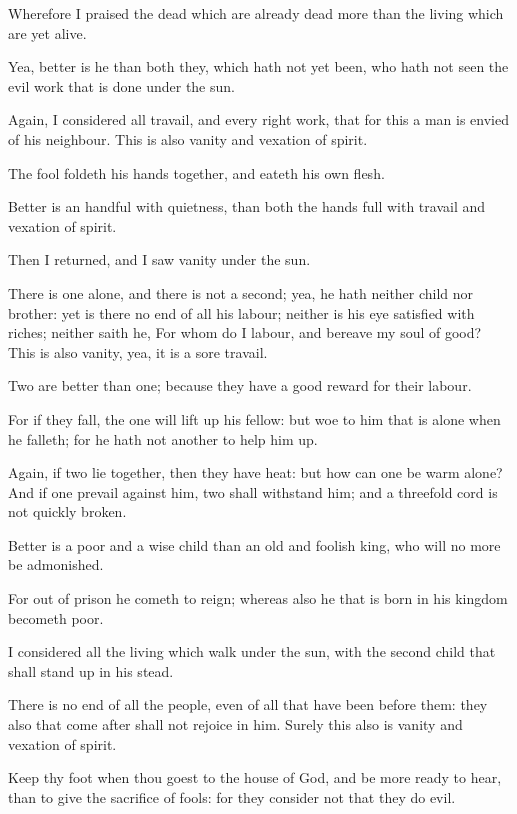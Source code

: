 \Verse Wherefore I praised the dead which are already dead more than the living which are yet alive.

\Verse Yea, better is he than both they, which hath not yet been, who hath not seen the evil work that is done under the sun.

\Verse Again, I considered all travail, and every right work, that for this a man is envied of his neighbour. This is also vanity and vexation of spirit.

\Verse The fool foldeth his hands together, and eateth his own flesh.

\Verse Better is an handful with quietness, than both the hands full with travail and vexation of spirit.

\Verse Then I returned, and I saw vanity under the sun.

\Verse There is one alone, and there is not a second; yea, he hath neither child nor brother: yet is there no end of all his labour; neither is his eye satisfied with riches; neither saith he, For whom do I labour, and bereave my soul of good? This is also vanity, yea, it is a sore travail.

\Verse Two are better than one; because they have a good reward for their labour.

\Verse For if they fall, the one will lift up his fellow: but woe to him that is alone when he falleth; for he hath not another to help him up.

\Verse Again, if two lie together, then they have heat: but how can one be warm alone?  \Verse And if one prevail against him, two shall withstand him; and a threefold cord is not quickly broken.

\Verse Better is a poor and a wise child than an old and foolish king, who will no more be admonished.

\Verse For out of prison he cometh to reign; whereas also he that is born in his kingdom becometh poor.

\Verse I considered all the living which walk under the sun, with the second child that shall stand up in his stead.

\Verse There is no end of all the people, even of all that have been before them: they also that come after shall not rejoice in him.  Surely this also is vanity and vexation of spirit.


\Chapter
\Verse Keep thy foot when thou goest to the house of God, and be more ready to hear, than to give the sacrifice of fools: for they consider not that they do evil.

